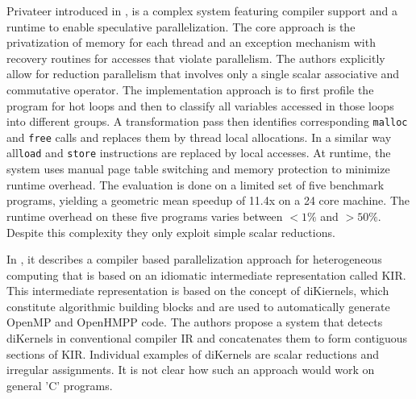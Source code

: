 Privateer introduced in \cite{Johnson:2012:SSP:2254064.2254107}, is a complex
system featuring compiler support and a runtime to enable speculative
parallelization.  The core approach is the privatization of memory
for each thread and an exception mechanism with recovery routines for
accesses that violate parallelism.  The authors explicitly allow for
reduction parallelism that involves only a single scalar associative
and commutative operator.  The implementation approach is to first
profile the program for hot loops and then to classify all variables
accessed in those loops into different groups.  A transformation pass
then identifies corresponding \texttt{malloc} and \texttt{free} calls
and replaces them by thread local allocations.  In a similar way
all\texttt{load} and \texttt{store} instructions are replaced by local
accesses.  At runtime, the system uses manual page table switching and
memory protection to minimize runtime overhead.  The evaluation is
done on a limited set of five benchmark programs, yielding a geometric
mean speedup of 11.4x on a 24 core machine.  The runtime overhead on
these five programs varies between $<1\%$ and $>50\%$.  Despite this
complexity they only exploit simple scalar reductions.

In \cite{Andion2015Compilation}, it describes a compiler based
parallelization approach for heterogeneous computing that is based on
an idiomatic intermediate representation called KIR.  This
intermediate representation is based on the concept
of \mbox{diKiernels}, which constitute algorithmic building blocks and
are used to automatically generate OpenMP and OpenHMPP code.  The
authors propose a system that detects diKernels in conventional
compiler IR and concatenates them to form contiguous sections of KIR.
Individual examples of diKernels are scalar reductions and irregular
assignments. It is not clear how such an approach would work on general
'C' programs.

